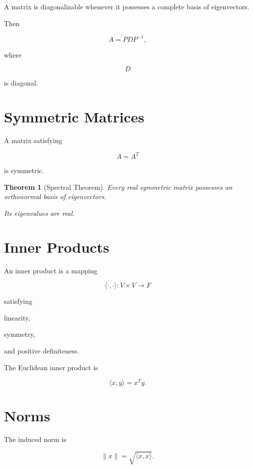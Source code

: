 \documentclass[11pt,fleqn]{book}
\numberwithin{equation}{chapter}
\theoremstyle{plain}
\newtheorem{theorem}{Theorem}[chapter]
\theoremstyle{definition}
\theoremstyle{remark}
\begin{document}
A matrix is diagonalizable whenever it possesses a complete basis of
eigenvectors.

Then

\[
A
=
PDP^{-1},
\]

where

\[
D
\]

is diagonal.


\section{Symmetric Matrices}

A matrix satisfying

\[
A=A^T
\]

is symmetric.

\begin{theorem}[Spectral Theorem]

Every real symmetric matrix possesses an orthonormal basis of
eigenvectors.

Its eigenvalues are real.

\end{theorem}


\section{Inner Products}

An inner product is a mapping

\[
\langle\cdot,\cdot\rangle
:
V\times V
\rightarrow
F
\]

satisfying

linearity,

symmetry,

and positive definiteness.

The Euclidean inner product is

\[
\langle x,y\rangle
=
x^Ty.
\]


\section{Norms}

The induced norm is

\[
\|x\|
=
\sqrt{\langle x,x\rangle}.
\]
\end{document}
